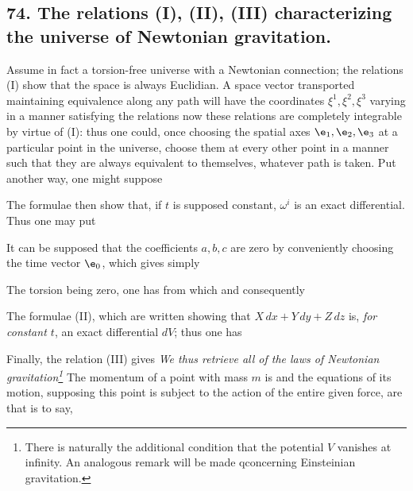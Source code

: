\subsection*{74. The relations (I), (II), (III) characterizing the universe of Newtonian gravitation.}

Assume in fact a torsion-free universe with a Newtonian connection; the relations (I) show that the space is always Euclidian. A space vector transported maintaining equivalence along any path will have the coordinates $\xi^1, \xi^2, \xi^3$ varying in a manner satisfying the relations
now these relations are completely integrable by virtue of (I): thus one could, once choosing the spatial axes $\e_1, \e_2, \e_3$ at a particular point in the universe, choose them at every other point in a manner such that they are always equivalent to themselves, whatever path is taken. Put another way, one might suppose

The formulae
then show that, if $t$ is supposed constant, $\omega^i$ is an exact differential. Thus one may put

It can be supposed that the coefficients $a, b, c$ are zero by conveniently choosing the time vector $\e_0$, which gives simply

The torsion being zero, one has
from which
and consequently

The formulae (II), which are written
showing that $X\,dx + Y\,dy + Z\,dz$ is, \textit{for constant $t$}, an exact differential $dV$; thus one has

Finally, the relation (III) gives
\textit{We thus retrieve all of the laws of Newtonian gravitation\footnote{There is naturally the additional condition that the potential $V$ vanishes at infinity. An analogous remark will be made   qconcerning Einsteinian gravitation.}} The momentum of a point with mass $m$ is
and the equations of its motion, supposing this point is subject to the action of the entire given force, are
that is to say,
